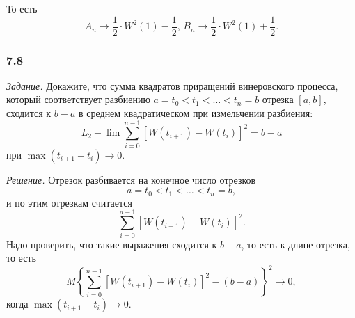 То есть
\begin{equation*}
  A_n \to \frac{1}{2} \cdot W^2 \left( 1 \right) - \frac{1}{2}, \,
  B_n \to \frac{1}{2} \cdot W^2 \left( 1 \right) + \frac{1}{2}.
\end{equation*}

\subsubsection*{7.8}

\textit{Задание.}
Докажите, что сумма квадратов приращений винеровского процесса,
который соответствует разбиению $a = t_0 < t_1 < \dotsc < t_n = b$ отрезка $ \left[ a, b \right] $,
сходится к $b - a$ в среднем квадратическом при измельчении разбиения:
\begin{equation*}
  L_2 - \lim
    \sum \limits_{i = 0}^{n - 1}
      \left[ W \left( t_{i + 1} \right) - W \left( t_i \right) \right]^2 =
  b - a
\end{equation*}
при $ \max \left( t_{i + 1} - t_i \right) \to 0$.

\textit{Решение.}
Отрезок разбивается на конечное число отрезков
\begin{equation*}
  a = t_0 < t_1 < \dotsc < t_n = b,
\end{equation*}
и по этим отрезкам считается
\begin{equation*}
  \sum \limits_{i = 0}^{n - 1}
    \left[ W \left( t_{i + 1} \right) - W \left( t_i \right) \right]^2.
\end{equation*}
Надо проверить, что такие выражения сходится к $b - a$, то есть к длине отрезка, то есть
\begin{equation*}
  M \left\{
    \sum \limits_{i = 0}^{n - 1}
      \left[ W \left( t_{i + 1} \right) - W \left( t_i \right) \right]^2 - \left( b - a \right)
  \right\}^2 \to 0,
\end{equation*}
когда $ \max \left( t_{i + 1} - t_i \right) \to 0$.

